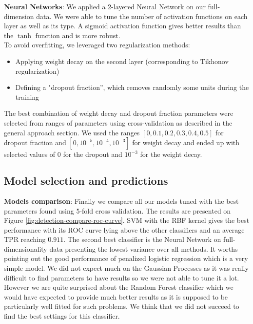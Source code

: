 \documentclass{article}
\begin{document}
  \textbf{Neural Networks}: We applied a 2-layered Neural Network on our full-dimension data. We were able to tune the number of activation functions on each layer as well as its type. A sigmoid activation function gives better results than the $\tanh$ function and is more robust.\\
  To avoid overfitting, we leveraged two regularization methods:
  \begin{itemize}
   	\item Applying weight decay on the second layer (corresponding to Tikhonov regularization)
	  \item Defining a "dropout fraction'', which removes randomly some units during the training \cite{dropout}
  \end{itemize}
	The best combination of weight decay and dropout fraction parameters were selected from ranges of parameters using cross-validation as described in the general approach section. We used  the ranges $[0, 0.1, 0.2, 0.3, 0.4, 0.5]$ for dropout fraction and $[0, 10^{-5}, 10^{-4}, 10^{-3}]$ for weight decay and ended up with selected values of $0$ for the dropout and $10^{-3}$ for the weight decay.\\

  \subsection{Model selection and predictions}
    \textbf{Models comparison}: Finally we compare all our models tuned with the best parameters found using 5-fold cross validation. The results are presented on Figure \ref{fig:detection-compare-roc-curve}. SVM with the RBF kernel gives the best performance with its ROC curve lying above the other classifiers and an average TPR reaching $0.911$. The second best classifier is the Neural Network on full-dimensionality data presenting the lowest variance over all methods. It worths pointing out the good performance of penalized logistic regression which is a very simple model. We did not expect much on the Gaussian Processes as it was really difficult to find parameters to have results so we were not able to tune it a lot. However we are quite surprised about the Random Forest classifier which we would have expected to provide much better results as it is supposed to be particularly well fitted for such problems. We think that we did not succeed to find the best settings for this classifier.
\end{document}
